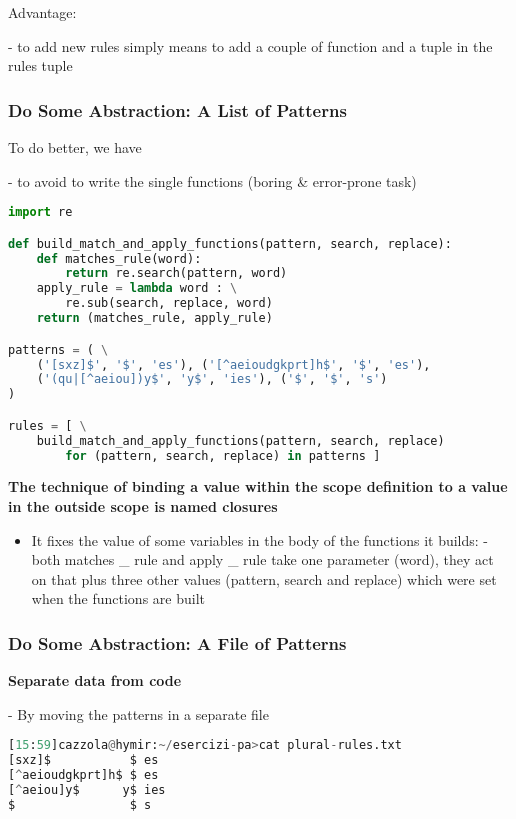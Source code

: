 Advantage:

- to add new rules simply means to add a couple of function and a tuple in the rules tuple

\subsubsection{Do Some Abstraction: A List of Patterns}
To do better, we have

- to avoid to write the single functions (boring \& error-prone task)

\begin{lstlisting}[language=Python]
import re

def build_match_and_apply_functions(pattern, search, replace):
	def matches_rule(word):
		return re.search(pattern, word)
	apply_rule = lambda word : \
		re.sub(search, replace, word)
	return (matches_rule, apply_rule)

patterns = ( \
	('[sxz]$', '$', 'es'), ('[^aeioudgkprt]h$', '$', 'es'),
	('(qu|[^aeiou])y$', 'y$', 'ies'), ('$', '$', 's')
)

rules = [ \
	build_match_and_apply_functions(pattern, search, replace)
		for (pattern, search, replace) in patterns ]
\end{lstlisting}

\textbf{The technique of binding a value within the scope definition to a value in the outside scope is named closures}

\begin{itemize}
	\item It fixes the value of some variables in the body of the functions it builds:
	- both matches \_ rule and apply \_ rule take one parameter (word), they act on that plus three other values (pattern, search and replace) which were set when the functions are built
\end{itemize}

\subsubsection{Do Some Abstraction: A File of Patterns}

\textbf{Separate data from code}

- By moving the patterns in a separate file

\begin{lstlisting}[language=Python]
[15:59]cazzola@hymir:~/esercizi-pa>cat plural-rules.txt
[sxz]$           $ es
[^aeioudgkprt]h$ $ es
[^aeiou]y$      y$ ies
$                $ s
\end{lstlisting}

